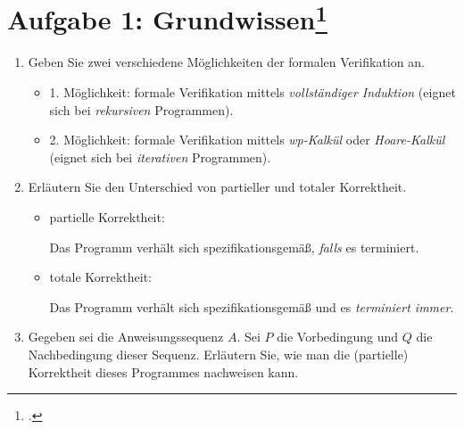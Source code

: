 \documentclass{lehramt-informatik-aufgabe}
\begin{document}

\section{Aufgabe 1: Grundwissen\footcite[Seite 1]{sosy:ab:8}}

\begin{enumerate}


\item Geben Sie zwei verschiedene Möglichkeiten der formalen
Verifikation an.

\begin{liAntwort}
\begin{itemize}
\item 1. Möglichkeit: formale Verifikation mittels \emph{vollständiger
Induktion} (eignet sich bei \emph{rekursiven} Programmen).

\item 2. Möglichkeit: formale Verifikation mittels
\emph{wp-Kalkül} oder
\emph{Hoare-Kalkül} (eignet sich bei
\emph{iterativen} Programmen).
\end{itemize}
\end{liAntwort}


\item Erläutern Sie den Unterschied von partieller und totaler Korrektheit.

\begin{liAntwort}
\begin{itemize}
\item partielle Korrektheit:

Das Programm verhält sich spezifikationsgemäß, \emph{falls} es
terminiert.

\item totale Korrektheit:

Das Programm verhält sich spezifikationsgemäß und es \emph{terminiert
immer}.
\end{itemize}
\end{liAntwort}


\item Gegeben sei die Anweisungssequenz $A$. Sei $P$ die Vorbedingung
und $Q$ die Nachbedingung dieser Sequenz. Erläutern Sie, wie man die
(partielle) Korrektheit dieses Programmes nachweisen kann.


\end{enumerate}
\end{document}
